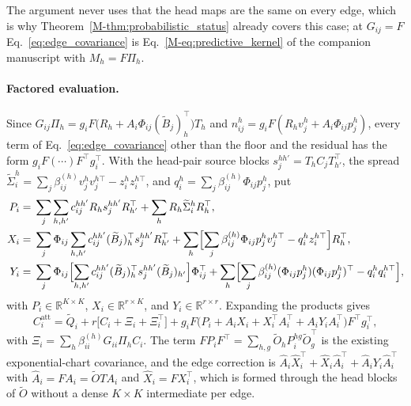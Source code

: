 \documentclass[11pt]{article}
\theoremstyle{definition}
\theoremstyle{remark}
\newcommand{\R}{\mathbb R}
\newcommand{\Ot}{\widetilde O}
\newcommand{\Bt}{\widetilde B}
\newcommand{\Mref}[1]{\ref{M-#1}}
\begin{document}
The argument never uses that the head maps are the same on every edge, which is why Theorem~\Mref{thm:probabilistic_status} already covers this case; at $G_{ij}=F$ Eq.~\eqref{eq:edge_covariance} is Eq.~\Mref{eq:predictive_kernel} of the companion manuscript with $M_h=F\Pi_h$.

\paragraph{Factored evaluation.}
Since $G_{ij}\Pi_h=g_iF\bigl(R_h+A_i\Phi_{ij}(\Bt_j)_h^\top\bigr)T_h$ and $n_{ij}^h=g_iF(R_hv_j^h+A_i\Phi_{ij}p_j^h)$, every term of Eq.~\eqref{eq:edge_covariance} other than the floor and the residual has the form $g_iF(\cdots)F^\top g_i^\top$. With the head-pair source blocks $s_j^{hh'}=T_hC_jT_{h'}^\top$, the spread $\widetilde\Sigma_i^h=\sum_j\beta_{ij}^{(h)}v_j^hv_j^{h\top}-z_i^hz_i^{h\top}$, and $q_i^h=\sum_j\beta_{ij}^{(h)}\Phi_{ij}p_j^h$, put
\begin{align}
P_i={}&\sum_j\sum_{h,h'}c_{ij}^{hh'}R_hs_j^{hh'}R_{h'}^\top+\sum_hR_h\widetilde\Sigma_i^hR_h^\top,\\
X_i={}&\sum_j\Phi_{ij}\sum_{h,h'}c_{ij}^{hh'}(\Bt_j)_h^\top s_j^{hh'}R_{h'}^\top+\sum_h\Bigl[\sum_j\beta_{ij}^{(h)}\Phi_{ij}p_j^hv_j^{h\top}-q_i^hz_i^{h\top}\Bigr]R_h^\top,\\
Y_i={}&\sum_j\Phi_{ij}\Bigl[\sum_{h,h'}c_{ij}^{hh'}(\Bt_j)_h^\top s_j^{hh'}(\Bt_j)_{h'}\Bigr]\Phi_{ij}^\top+\sum_h\Bigl[\sum_j\beta_{ij}^{(h)}(\Phi_{ij}p_j^h)(\Phi_{ij}p_j^h)^\top-q_i^hq_i^{h\top}\Bigr],
\end{align}
with $P_i\in\R^{K\times K}$, $X_i\in\R^{r\times K}$, and $Y_i\in\R^{r\times r}$. Expanding the products gives
\begin{equation}
C_i^{\mathrm{att}}=\widetilde Q_i+r\bigl[C_i+\Xi_i+\Xi_i^\top\bigr]+g_iF\bigl(P_i+A_iX_i+X_i^\top A_i^\top+A_iY_iA_i^\top\bigr)F^\top g_i^\top,
\label{eq:factored_covariance}
\end{equation}
with $\Xi_i=\sum_h\beta_{ii}^{(h)}G_{ii}\Pi_hC_i$. The term $FP_iF^\top=\sum_{h,g}\Ot_hP_i^{hg}\Ot_g^\top$ is the existing exponential-chart covariance, and the edge correction is $\hat A_i\hat X_i^\top+\hat X_i\hat A_i^\top+\hat A_iY_i\hat A_i^\top$ with $\hat A_i=FA_i=\Ot TA_i$ and $\hat X_i=FX_i^\top$, which is formed through the head blocks of $\Ot$ without a dense $K\times K$ intermediate per edge.
\end{document}
